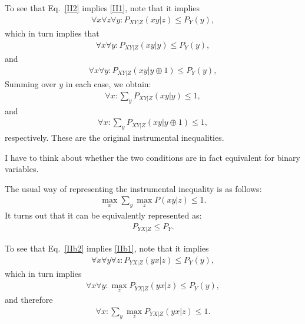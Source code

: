 \documentclass[aps,english,superscriptaddress,onecolumn,twoside,longbibliography,pra,floatfix,fleqn,nofootinbib]{revtex4-1}%
\theoremstyle{definition}
\begin{document}
To see that Eq.~\eqref{II2} implies \eqref{II1}, note that it implies 
\begin{align}
\forall x \forall z \forall y:  P_{XY|Z}(xy|z) \le P_Y(y),
\end{align}
which in turn implies that
\begin{align}
\forall x  \forall y:  P_{XY|Z}(xy|y) \le P_Y(y),
\end{align}
and 
\begin{align}
\forall x  \forall y:  P_{XY|Z}(xy|y\oplus 1) \le P_Y(y),
\end{align}
Summing over $y$ in each case, we obtain:
\begin{align}
\forall x : \sum_y  P_{XY|Z}(xy|y) \le 1,
\end{align}
and 
\begin{align}
\forall x : \sum_y  P_{XY|Z}(xy|y\oplus 1) \le 1,
\end{align}
respectively.  
These are the original instrumental inequalities.  

I have to think about whether the two conditions are in fact equivalent for binary variables.

The usual way of representing the instrumental inequality is as follows:
\begin{align}
\max_x \sum_y \max_z P(xy|z) \le 1.
\label{IIb1}
\end{align}
It turns out that it can be equivalently represented as:
\begin{align}
P_{YX|Z} \le P_Y.
\label{IIb2}
\end{align}

To see that Eq.~\eqref{IIb2} implies \eqref{IIb1}, note that it implies 
\begin{align}
\forall x \forall y \forall z: P_{YX|Z}(yx|z) \le P_Y (y),
\end{align}
which in turn implies 
\begin{align}
\forall x \forall y :\max_z P_{YX|Z}(yx|z) \le P_Y (y),
\end{align}
and therefore
\begin{align}
\forall x : \sum_y \max_z P_{YX|Z}(yx|z) \le 1.
\end{align}
\end{document}
